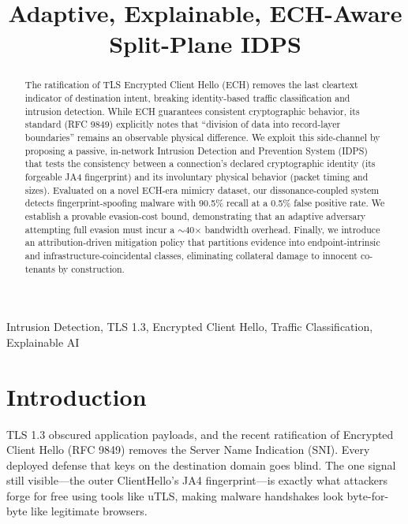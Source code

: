 \documentclass[10pt, conference]{IEEEtran}
\begin{document}
\title{Adaptive, Explainable, ECH-Aware Split-Plane IDPS}

\author{}

\maketitle

\begin{abstract}
The ratification of TLS Encrypted Client Hello (ECH) removes the last cleartext indicator of destination intent, breaking identity-based traffic classification and intrusion detection. While ECH guarantees consistent cryptographic behavior, its standard (RFC 9849) explicitly notes that ``division of data into record-layer boundaries'' remains an observable physical difference. We exploit this side-channel by proposing a passive, in-network Intrusion Detection and Prevention System (IDPS) that tests the consistency between a connection's declared cryptographic identity (its forgeable JA4 fingerprint) and its involuntary physical behavior (packet timing and sizes). Evaluated on a novel ECH-era mimicry dataset, our dissonance-coupled system detects fingerprint-spoofing malware with 90.5\% recall at a 0.5\% false positive rate. We establish a provable evasion-cost bound, demonstrating that an adaptive adversary attempting full evasion must incur a $\sim$40$\times$ bandwidth overhead. Finally, we introduce an attribution-driven mitigation policy that partitions evidence into endpoint-intrinsic and infrastructure-coincidental classes, eliminating collateral damage to innocent co-tenants by construction.
\end{abstract}

\begin{IEEEkeywords}
Intrusion Detection, TLS 1.3, Encrypted Client Hello, Traffic Classification, Explainable AI
\end{IEEEkeywords}

\section{Introduction}
TLS 1.3 obscured application payloads, and the recent ratification of Encrypted Client Hello (RFC 9849) \cite{rfc9849} removes the Server Name Indication (SNI). Every deployed defense that keys on the destination domain goes blind. The one signal still visible---the outer ClientHello's JA4 fingerprint---is exactly what attackers forge for free using tools like uTLS, making malware handshakes look byte-for-byte like legitimate browsers.
\end{document}
